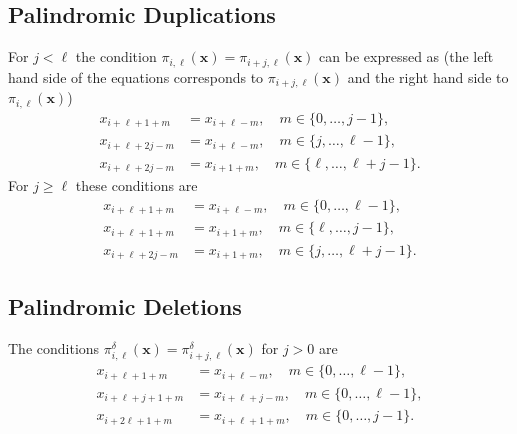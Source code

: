 \documentclass[a4paper]{llncs}
\newcommand{\ve}[1]{\boldsymbol{#1}}
\begin{document}
	\subsection{Palindromic Duplications}
	For $j < \ell$ the condition $\pi_{i,\ell}(\ve{x}) = \pi_{i+j,\ell}(\ve{x})$ can be expressed as (the left hand side of the equations corresponds to $\pi_{i+j,\ell}(\ve{x})$ and the right hand side to $\pi_{i,\ell}(\ve{x})$)\\
	\vspace{-15pt}
	\begin{subequations}
		\begin{align}
		x_{i+\ell+1+m}  &= x_{i+\ell-m}, \quad m \in \{0, \dots, j-1\}, \label{eq:cond_j_less_l_a} \\
		x_{i+\ell+2j-m}  &= x_{i+\ell-m}, \quad m \in \{j, \dots, \ell-1\},\label{eq:cond_j_less_l_b}  \\
		x_{i+\ell+2j-m}  &= x_{i+1+m}, \quad m \in \{\ell, \dots, \ell+j-1\}. \label{eq:cond_j_less_l_c}
		\end{align}
	\end{subequations}
	For $j \geq \ell$ these conditions are \\
	\vspace{-15pt}
	\begin{subequations}
		\begin{align}
		x_{i+\ell+1+m}  &= x_{i+\ell-m}, \quad m \in \{0, \dots, \ell-1\}, \label{eq:cond_j_geq_l_a} \\
		x_{i+\ell+1+m}  &= x_{i+1+m}, \quad m \in \{\ell, \dots, j-1\}, \label{eq:cond_j_geq_l_b} \\
		x_{i+\ell+2j-m}  &= x_{i+1+m}, \quad m \in \{j, \dots, \ell+j-1\}. \label{eq:cond_j_geq_l_c}
		\end{align}
	\end{subequations}
	\subsection{Palindromic Deletions}
	The conditions $\pi^\delta_{i,\ell}(\ve{x}) = \pi^\delta_{i+j,\ell}(\ve{x})$ for $j>0$ are\\
	\vspace{-15pt}
	\begin{subequations}
		\begin{align}
		x_{i+\ell+1+m}  &= x_{i+\ell-m}, \quad m \in \{0, \dots, \ell-1\}, \label{eq:cond_del_a} \\
		x_{i+\ell+j+1+m}  &= x_{i+\ell+j-m}, \quad m \in \{0, \dots, \ell-1\}, \label{eq:cond_del_b} \\
		x_{i+2\ell+1+m}  &= x_{i+\ell+1+m}, \quad m \in \{0, \dots, j-1\}. \label{eq:cond_del_c}
		\end{align}
	\end{subequations}
	
	
	
	
	
\end{document}
